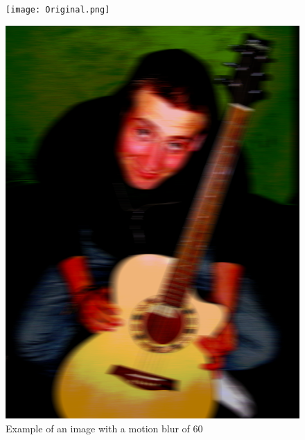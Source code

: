 \begin{itemize}
\vfill
\begin{figure}[ht]
\begin{minipage}[b]{0.47\linewidth}
\centering
\texttt{[image: Original.png]}
\end{minipage}
\hspace{0.1cm}
\begin{minipage}[b]{0.47\linewidth}
\centering
\includegraphics[width=\textwidth]{Motion.png}
\end{minipage}
\caption{Example of an image with a motion blur of 60}
\end{figure}
\vfill

\end{itemize}

